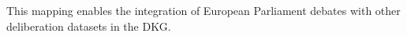 \documentclass[runningheads]{llncs}  %
\begin{document}
This mapping enables the integration of European Parliament debates with other deliberation datasets in the DKG.

\begin{comment}
    
\subsection{Sample Conversion}
Here is a sample of the conversion process for a speech in the European Parliament:

\begin{lstlisting}[language=json,caption=JSON-LD representation of a speech]
{
  "@context": {
    "dkg": "https://w3id.org/deliberation/ontology#",
    "rdf": "http://www.w3.org/1999/02/22-rdf-syntax-ns#",
    "rdfs": "http://www.w3.org/2000/01/rdf-schema#",
    "xsd": "http://www.w3.org/2001/XMLSchema#"
  },
  "@type": "dkg:Contribution",
  "dkg:identifier": "contribution_1",
  "dkg:text": "First of all, dear colleagues, two years ago, on 28 February 2023, in Tempi, Greece, a tragic railway accident cost 57 people their lives and injured even more. We mark a sad anniversary today as our hearts go out to the victims, to those who lost their loved ones and to the injured who still bear the scars of that day. This House remembers them and honours them.",
  "dkg:timestamp": "2025-03-10T17:02:43",
  "dkg:madeBy": {
    "@id": "participant_1"
  }
}
\end{lstlisting}

And the corresponding RDF/XML representation:

\begin{lstlisting}[language=xml,caption=RDF/XML representation of a speech]
<rdf:Description rdf:about="https://w3id.org/deliberation/resource/contribution_1">
  <rdf:type rdf:resource="https://w3id.org/deliberation/ontology#Contribution"/>
  <dkg:identifier>contribution_1</dkg:identifier>
  <dkg:text>First of all, dear colleagues, two years ago, on 28 February 2023, in Tempi, Greece, a tragic railway accident cost 57 people their lives and injured even more. We mark a sad anniversary today as our hearts go out to the victims, to those who lost their loved ones and to the injured who still bear the scars of that day. This House remembers them and honours them.</dkg:text>
  <dkg:timestamp rdf:datatype="http://www.w3.org/2001/XMLSchema#dateTime">2025-03-10T17:02:43</dkg:timestamp>
  <dkg:madeBy rdf:resource="https://w3id.org/deliberation/resource/participant_1"/>
</rdf:Description>
\end{lstlisting}


\end{comment}
\end{document}
